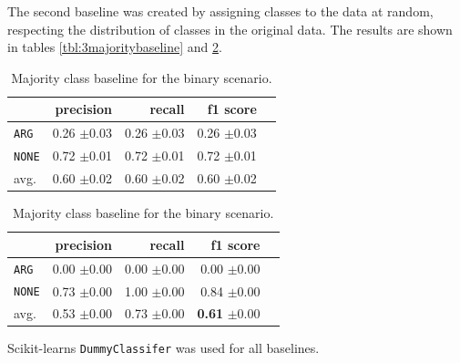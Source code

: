 The second baseline was created by assigning classes to the data at random, respecting the distribution of classes in the original data. The results are shown in tables \ref{tbl:3majoritybaseline} and \ref{tbl:binstrat}.



\begin{table}[!htb]
	\begin{minipage}{.5\linewidth}
		\caption{Random (stratified) baseline for the binary scenario.}
		\label{tbl:binmaj}
		\centering
		      
		\begin{tabularx}{0.97\linewidth}{Xrrrr}
			\toprule
			              & precision                    & recall                       & f1 score                              \\ \midrule 
			\texttt{ARG}  & 0.26 \scriptsize{$\pm$0.03} & 0.26 \scriptsize{$\pm$0.03} & 0.26 \scriptsize{$\pm$0.03}          \\ 
			\texttt{NONE} & 0.72 \scriptsize{$\pm$0.01} & 0.72 \scriptsize{$\pm$0.01} & 0.72 \scriptsize{$\pm$0.01}          \\ 
			avg.       & 0.60 \scriptsize{$\pm$0.02} & 0.60 \scriptsize{$\pm$0.02} & 0.60 \scriptsize{$\pm$0.02} \\ 
			\bottomrule
		\end{tabularx}
		
	\end{minipage}%
	\begin{minipage}{.5\linewidth}
		\centering
		\caption{Majority class baseline for the binary scenario.}
		\label{tbl:binstrat}
		\begin{tabularx}{0.97\linewidth}{Xrrrr}
			\toprule
			              & precision                    & recall                       & f1 score                     \\ \midrule 
			\texttt{ARG}  & 0.00 \scriptsize{$\pm$0.00} & 0.00 \scriptsize{$\pm$0.00} & 0.00 \scriptsize{$\pm$0.00} \\ 
			\texttt{NONE} & 0.73 \scriptsize{$\pm$0.00} & 1.00 \scriptsize{$\pm$0.00} & 0.84 \scriptsize{$\pm$0.00} \\ 
			avg.       & 0.53 \scriptsize{$\pm$0.00} & 0.73 \scriptsize{$\pm$0.00} & \textbf{0.61} \scriptsize{$\pm$0.00} \\ 
			\bottomrule
		\end{tabularx}
	\end{minipage} 
\end{table}
Scikit-learns \texttt{DummyClassifer} was used for all baselines.

